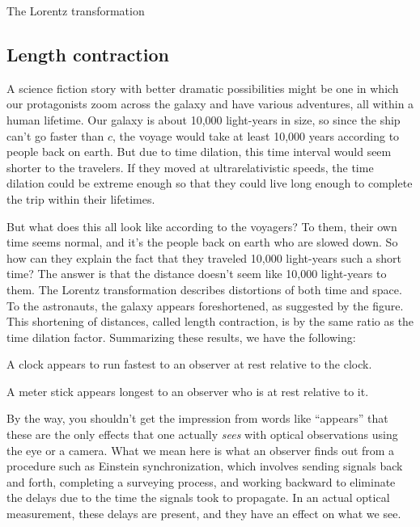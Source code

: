 \begin{section}{The Lorentz transformation}
\section{Length contraction}

A science fiction story with better dramatic possibilities might be one in which our protagonists zoom across the
galaxy and have various adventures, all within a human lifetime. Our galaxy is about 10,000 light-years in size,
so since the ship can't go faster than $c$, the voyage would take at least 10,000 years according to people back
on earth. But due to time dilation, this time interval would seem shorter to the travelers. If they moved
at ultrarelativistic speeds, the time dilation could be extreme enough so that they could
live long enough to complete the trip within their lifetimes.


But what does this all look like according to the voyagers? To them, their own time seems normal, and it's the
people back on earth who are slowed down. So how can they explain the fact that they traveled 10,000 light-years
such a short time? The answer is that the distance doesn't seem like 10,000 light-years to them.
The Lorentz transformation describes distortions of both time and space. To the astronauts, the galaxy appears
foreshortened, as suggested by the figure. This shortening of distances, called length contraction, is by the
same ratio as the time dilation factor. Summarizing these results, we have the following:

\begin{important}
A clock appears to run fastest to an observer at rest relative to  the clock.
\end{important}

\begin{important}
A meter stick appears longest to an observer who is at rest relative to it.
\end{important}


By the way, you shouldn't get the impression from words like ``appears'' that these are the only effects that
one actually \emph{sees} with optical observations using the eye or a camera. What we mean here is what an
observer finds out from a procedure such as Einstein synchronization, which involves
sending signals back and forth, completing a surveying process, and working backward to eliminate the
delays due to the time the signals took to propagate. In an actual optical measurement, these delays
are present, and they have an effect on what we see.


\end{section}
